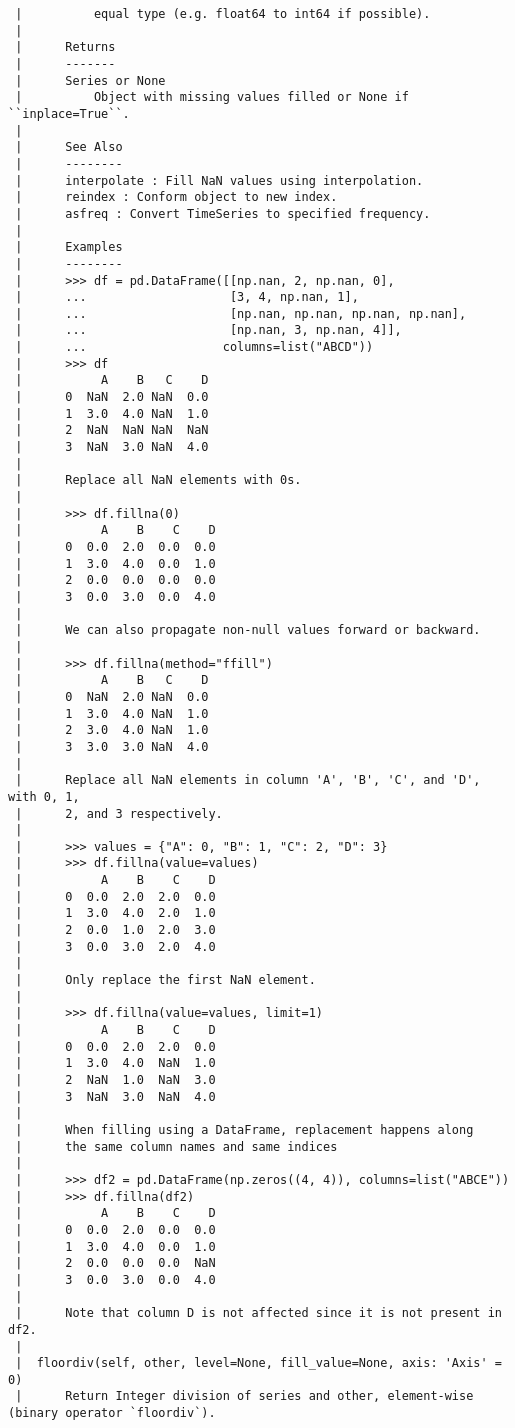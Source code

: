 \documentclass[
  letterpaper,
  DIV=11,
  numbers=noendperiod]{scrreprt}
\begin{document}
\begin{verbatim}
 |          equal type (e.g. float64 to int64 if possible).
 |      
 |      Returns
 |      -------
 |      Series or None
 |          Object with missing values filled or None if ``inplace=True``.
 |      
 |      See Also
 |      --------
 |      interpolate : Fill NaN values using interpolation.
 |      reindex : Conform object to new index.
 |      asfreq : Convert TimeSeries to specified frequency.
 |      
 |      Examples
 |      --------
 |      >>> df = pd.DataFrame([[np.nan, 2, np.nan, 0],
 |      ...                    [3, 4, np.nan, 1],
 |      ...                    [np.nan, np.nan, np.nan, np.nan],
 |      ...                    [np.nan, 3, np.nan, 4]],
 |      ...                   columns=list("ABCD"))
 |      >>> df
 |           A    B   C    D
 |      0  NaN  2.0 NaN  0.0
 |      1  3.0  4.0 NaN  1.0
 |      2  NaN  NaN NaN  NaN
 |      3  NaN  3.0 NaN  4.0
 |      
 |      Replace all NaN elements with 0s.
 |      
 |      >>> df.fillna(0)
 |           A    B    C    D
 |      0  0.0  2.0  0.0  0.0
 |      1  3.0  4.0  0.0  1.0
 |      2  0.0  0.0  0.0  0.0
 |      3  0.0  3.0  0.0  4.0
 |      
 |      We can also propagate non-null values forward or backward.
 |      
 |      >>> df.fillna(method="ffill")
 |           A    B   C    D
 |      0  NaN  2.0 NaN  0.0
 |      1  3.0  4.0 NaN  1.0
 |      2  3.0  4.0 NaN  1.0
 |      3  3.0  3.0 NaN  4.0
 |      
 |      Replace all NaN elements in column 'A', 'B', 'C', and 'D', with 0, 1,
 |      2, and 3 respectively.
 |      
 |      >>> values = {"A": 0, "B": 1, "C": 2, "D": 3}
 |      >>> df.fillna(value=values)
 |           A    B    C    D
 |      0  0.0  2.0  2.0  0.0
 |      1  3.0  4.0  2.0  1.0
 |      2  0.0  1.0  2.0  3.0
 |      3  0.0  3.0  2.0  4.0
 |      
 |      Only replace the first NaN element.
 |      
 |      >>> df.fillna(value=values, limit=1)
 |           A    B    C    D
 |      0  0.0  2.0  2.0  0.0
 |      1  3.0  4.0  NaN  1.0
 |      2  NaN  1.0  NaN  3.0
 |      3  NaN  3.0  NaN  4.0
 |      
 |      When filling using a DataFrame, replacement happens along
 |      the same column names and same indices
 |      
 |      >>> df2 = pd.DataFrame(np.zeros((4, 4)), columns=list("ABCE"))
 |      >>> df.fillna(df2)
 |           A    B    C    D
 |      0  0.0  2.0  0.0  0.0
 |      1  3.0  4.0  0.0  1.0
 |      2  0.0  0.0  0.0  NaN
 |      3  0.0  3.0  0.0  4.0
 |      
 |      Note that column D is not affected since it is not present in df2.
 |  
 |  floordiv(self, other, level=None, fill_value=None, axis: 'Axis' = 0)
 |      Return Integer division of series and other, element-wise (binary operator `floordiv`).

\end{verbatim}
\end{document}
